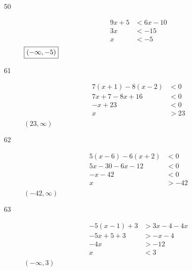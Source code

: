 \documentclass[letterpaper, landscape]{exam}
\begin{document}
\begin{description}
      \item[50]
        \begin{align*}
          9x + 5 & < 6x - 10 \\
          3x     & < -15 \\
          x      & < -5 \\
        \end{align*}
        $\boxed{ \intoo{ -\infty, -5 } }$


      \item[61]
        \begin{align*}
          7(x + 1) - 8(x - 2) & < 0 \\
          7x + 7 - 8x + 16    & < 0 \\
          -x + 23             & < 0 \\
          x                   & > 23 \\
        \end{align*}
        $\boxed{ (23, \infty) }$

      \item[62]
        \begin{align*}
          5(x - 6) -6(x + 2) & < 0 \\
          5x - 30 - 6x -12   & < 0 \\
          -x - 42            & < 0 \\
          x                  & > -42 \\
        \end{align*}
        $\boxed{ (-42, \infty) }$

      \item[63]
        \begin{align*}
          -5(x - 1) + 3 & > 3x - 4 -4x \\
          -5x + 5 + 3   & > -x - 4 \\
          -4x           & > -12 \\
          x             & < 3 \\
        \end{align*}
        $\boxed{ (-\infty, 3) }$


\end{description}
\end{document}
